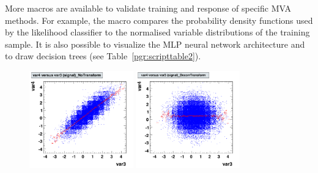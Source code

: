 More macros are available to validate training and response of specific 
MVA methods. For example, the macro  compares the 
probability density functions used by the likelihood classifier to the normalised 
variable distributions of the training sample. It is also possible to visualize 
the MLP neural network architecture and to draw decision trees (see 
Table~\ref{pgr:scripttable2}).
\begin{figure}[t]
\begin{center}
  \def\thissize{0.40}
  \includegraphics[width=\thissize\textwidth]{plots/correlationscatter__NoTransform_c1}
  \includegraphics[width=\thissize\textwidth]{plots/correlationscatter__DecorrTransform_c1}


\end{center}
\end{figure}
